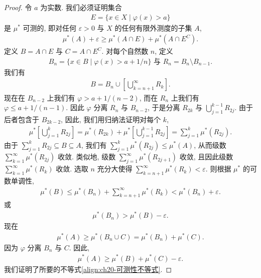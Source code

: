 \documentclass[../../main.tex]{subfiles}
\begin{document}
\begin{proof}
令 $a$ 为实数. 我们必须证明集合
\begin{align*}
E=\{x\in X\mid\varphi(x)>a\}
\end{align*}
是 $\mu^{*}$ 可测的, 即对任何 $\varepsilon>0$ 与 $X$ 的任何有限外测度的子集 $A$,
\begin{align}\label{align:ch20-可测性不等式}
\mu^{*}(A)+\varepsilon\geqslant\mu^{*}(A\cap E)+\mu^{*}(A\cap E^{C}).
\end{align}
定义 $B=A\cap E$ 与 $C=A\cap E^{C}$. 对每个自然数 $n$, 定义
\begin{align*}
B_{n}=\{x\in B\mid\varphi(x)>a+1/n\}\text{ 与 }R_{n}=B_{n}\setminus B_{n-1}.
\end{align*}
我们有
\begin{align*}
B=B_{n}\cup\left[\bigcup_{k=n+1}^{\infty}R_{k}\right].
\end{align*}
现在在 $B_{n-2}$ 上我们有 $\varphi>a+1/(n-2)$, 而在 $R_{n}$ 上我们有 $\varphi\leqslant a+1/(n-1)$. 因此 $\varphi$ 分离 $R_{n}$ 与 $B_{n-2}$, 于是分离 $R_{2k}$ 与 $\bigcup_{j=1}^{k-1}R_{2j}$. 由于后者包含于 $B_{2k-2}$, 因此, 我们用归纳法证明对每个 $k$,
\begin{align*}
\mu^{*}\left[\bigcup_{j=1}^{k}R_{2j}\right]=\mu^{*}(R_{2k})+\mu^{*}\left[\bigcup_{j=1}^{k-1}R_{2j}\right]=\sum_{j=1}^{k}\mu^{*}(R_{2j}).
\end{align*}
由于 $\sum_{j=1}^{k}R_{2j}\subseteq B\subseteq A$, 我们有 $\sum_{j=1}^{k}\mu^{*}(R_{2j})\leqslant\mu^{*}(A)$, 从而级数 $\sum_{k=1}^{\infty}\mu^{*}(R_{2j})$ 收敛. 类似地, 级数 $\sum_{j=1}^{\infty}\mu^{*}(R_{2j+1})$ 收敛, 且因此级数 $\sum_{k=1}^{\infty}\mu^{*}(R_{k})$ 收敛. 选取 $n$ 充分大使得 $\sum_{k=n+1}^{\infty}\mu^{*}(R_{k})<\varepsilon$. 则根据 $\mu^{*}$ 的可数单调性,
\begin{align*}
\mu^{*}(B)\leqslant\mu^{*}(B_{n})+\sum_{k=n+1}^{\infty}\mu^{*}(R_{k})<\mu^{*}(B_{n})+\varepsilon.
\end{align*}
或
\begin{align*}
\mu^{*}(B_{n})>\mu^{*}(B)-\varepsilon.
\end{align*}
现在
\begin{align*}
\mu^{*}(A)\geqslant\mu^{*}(B_{n}\cup C)=\mu^{*}(B_{n})+\mu^{*}(C).
\end{align*}
因为 $\varphi$ 分离 $B_{n}$ 与 $C$. 因此,
\begin{align*}
\mu^{*}(A)\geqslant\mu^{*}(B)+\mu^{*}(C)-\varepsilon.
\end{align*}
我们证明了所要的不等式\eqref{align:ch20-可测性不等式}.
\end{proof}
\end{document}
